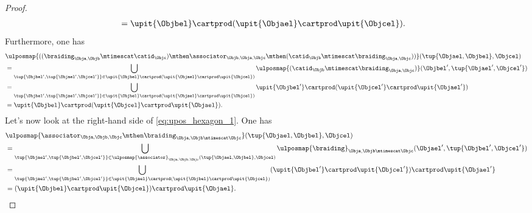 \begin{proof}
\begin{equation*}
\begin{aligned}
             & =\upit\{\Objbel\} \cartprod (\upit \{\Objael\}\cartprod \upit\{ \Objcel\}).
        \end{aligned}
    \end{equation*}
    Furthermore, one has
    \begin{equation}
        \label{eq:upos_hexagon_2}
        \begin{aligned}
             & \ulposmap{((\braiding_{\Obja,\Objb}\mtimescat \catid_\Objc) \mthen \associator_{\Objb,\Obja,\Objc}\mthen (\catid_{\Objb}\mtimescat \braiding_{\Obja,\Objc}))}(\tup{\Objael,\Objbel},\Objcel)                                   \\
             & =\bigcup_{\tup{\Objbel',\tup{\Objael',\Objcel'}}\in \upit\{\Objbel\} \cartprod (\upit \{\Objael\}\cartprod \upit\{ \Objcel\})} \ulposmap{(\catid_{\Objb}\mtimescat \braiding_{\Obja,\Objc})}(\Objbel',\tup{\Objael',\Objcel'}) \\
             & =\bigcup_{\tup{\Objbel',\tup{\Objael',\Objcel'}}\in \upit\{\Objbel\} \cartprod (\upit \{\Objael\}\cartprod \upit\{ \Objcel\})} \upit\{\Objbel'\}\cartprod (\upit\{\Objcel'\}\cartprod \upit\{\Objael'\})                       \\
             & =\upit\{\Objbel\} \cartprod (\upit \{\Objcel\}\cartprod \upit\{ \Objael\}).
        \end{aligned}
    \end{equation}
    Let's now look at the right-hand side of \cref{eq:upos_hexagon_1}.
    One has
    \begin{equation*}
        \begin{aligned}
             & \ulposmap{\associator_{\Obja,\Objb,\Objc} \mthen \braiding_{\Obja,\Objb\mtimescat \Objc}}(\tup{\Objael,\Objbel},\Objcel)                                                                                          \\
             & =\bigcup_{\tup{\Objael',\tup{\Objbel',\Objcel'}}\in \ulposmap{\associator}_{\Obja,\Objb,\Objc}(\tup{\Objael,\Objbel},\Objcel)}\ulposmap{\braiding}_{\Obja,\Objb\mtimescat\Objc}(\Objael',\tup{\Objbel',\Objcel'}) \\
             & =\bigcup_{\tup{\Objael',\tup{\Objbel',\Objcel'}}\in \upit\{\Objael\} \cartprod (\upit \{ \Objbel\}\cartprod \upit\{ \Objcel\})} (\upit\{\Objbel'\} \cartprod \upit \{ \Objcel'\})\cartprod \upit\{ \Objael'\}     \\
             & =(\upit\{\Objbel\} \cartprod \upit \{ \Objcel\})\cartprod \upit\{ \Objael\}.
        \end{aligned}

\end{equation*}
\end{proof}
